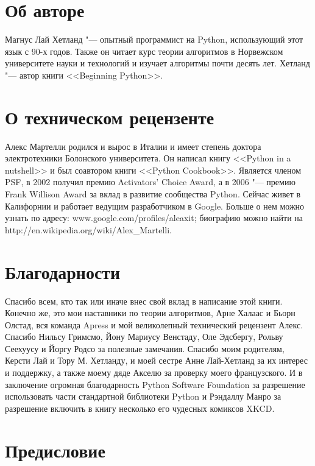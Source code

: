 \chapter*{Об авторе}

Магнус Лай Хетланд "--- опытный программист на Python, использующий этот язык с 90-х годов. Также он читает курс теории алгоритмов в Норвежском университете науки и технологий и изучает алгоритмы почти десять лет. Хетланд "--- автор книги <<Beginning Python>>.

\chapter*{О техническом рецензенте}

Алекс Мартелли родился и вырос в Италии и имеет степень доктора электротехники Болонского университета. Он написал книгу <<Python in a nutshell>> и был соавтором книги <<Python Cookbook>>. Является членом PSF, в 2002 получил премию Activators’ Choice Award, а в 2006 "--- премию Frank Willison Award за вклад в развитие сообщества Python. Сейчас живет в Калифорнии и работает ведущим разработчиком в Google. Больше о нем можно узнать по адресу: www.google.com/profiles/aleaxit; биографию можно найти на http://en.wikipedia.org/wiki/Alex\_Martelli.


\chapter*{Благодарности}

Спасибо всем, кто так или иначе внес свой вклад в написание этой книги. Конечно же, это мои наставники по теории алгоритмов, Арне Халаас и Бьорн Олстад, вся команда Apress и мой великолепный технический рецензент Алекс. Спасибо Нильсу Гримсмо, Йону Мариусу Венстаду, Оле Эдсбергу, Рольву Сеехуусу и Йоргу Родсо за полезные замечания. Спасибо моим родителям, Керсти Лай и Тору М. Хетланду, и моей сестре Анне Лай-Хетланд за их интерес и поддержку, а также моему дяде Акселю за проверку моего французского. И в заключение огромная благодарность Python Software Foundation за разрешение использовать части стандартной библиотеки Python и Рэндаллу Манро за разрешение включить в книгу несколько его чудесных комиксов XKCD.


\chapter*{Предисловие}

